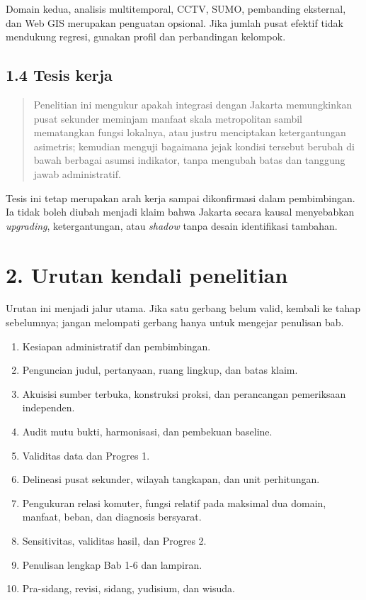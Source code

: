\documentclass[
  indonesian,
  11pt,
]{article}
\providecommand{\tightlist}{%
  \setlength{\itemsep}{0pt}\setlength{\parskip}{0pt}}
\renewcommand{\tightlist}{%
  \setlength{\itemsep}{0.22em}%
  \setlength{\parskip}{0pt}%
}
\begin{document}
Domain kedua, analisis multitemporal, CCTV, SUMO, pembanding eksternal,
dan Web GIS merupakan penguatan opsional. Jika jumlah pusat efektif
tidak mendukung regresi, gunakan profil dan perbandingan kelompok.

\subsection{1.4 Tesis kerja}\label{tesis-kerja}

\begin{quote}
Penelitian ini mengukur apakah integrasi dengan Jakarta memungkinkan
pusat sekunder meminjam manfaat skala metropolitan sambil mematangkan
fungsi lokalnya, atau justru menciptakan ketergantungan asimetris;
kemudian menguji bagaimana jejak kondisi tersebut berubah di bawah
berbagai asumsi indikator, tanpa mengubah batas dan tanggung jawab
administratif.
\end{quote}

Tesis ini tetap merupakan arah kerja sampai dikonfirmasi dalam
pembimbingan. Ia tidak boleh diubah menjadi klaim bahwa Jakarta secara
kausal menyebabkan \emph{upgrading}, ketergantungan, atau \emph{shadow}
tanpa desain identifikasi tambahan.

\section{2. Urutan kendali penelitian}\label{urutan-kendali-penelitian}

Urutan ini menjadi jalur utama. Jika satu gerbang belum valid, kembali
ke tahap sebelumnya; jangan melompati gerbang hanya untuk mengejar
penulisan bab.

\begin{enumerate}
\def\labelenumi{\arabic{enumi}.}
\tightlist
\item
  Kesiapan administratif dan pembimbingan.
\item
  Penguncian judul, pertanyaan, ruang lingkup, dan batas klaim.
\item
  Akuisisi sumber terbuka, konstruksi proksi, dan perancangan
  pemeriksaan independen.
\item
  Audit mutu bukti, harmonisasi, dan pembekuan baseline.
\item
  Validitas data dan Progres 1.
\item
  Delineasi pusat sekunder, wilayah tangkapan, dan unit perhitungan.
\item
  Pengukuran relasi komuter, fungsi relatif pada maksimal dua domain,
  manfaat, beban, dan diagnosis bersyarat.
\item
  Sensitivitas, validitas hasil, dan Progres 2.
\item
  Penulisan lengkap Bab 1-6 dan lampiran.
\item
  Pra-sidang, revisi, sidang, yudisium, dan wisuda.
\end{enumerate}
\end{document}
